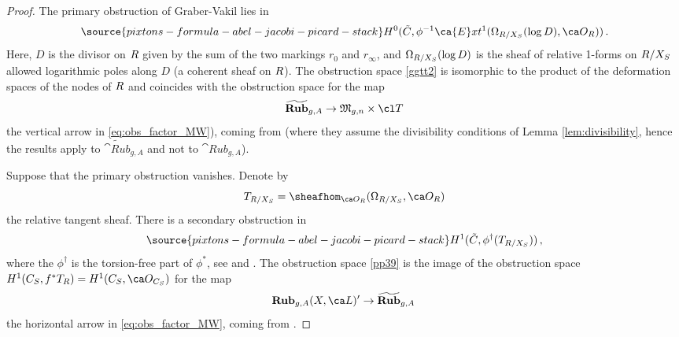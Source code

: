 \begin{proof}
The primary obstruction of Graber-Vakil lies in
\begin{equation}\label{ggtt2}
\source{pixtons-formula-abel-jacobi-picard-stack}
H^0(\tilde C, \phi^{-1}\ca{E}xt^1(\Omega_{\R/X_S}(\log D), \ca O_{\R}))\, .
\end{equation}
Here, $D$ is the divisor on $R$ given by the sum of the two markings $r_0$ and $r_\infty$, and $\Omega_{R/X_S}(\log D)$ is the sheaf of relative 1-forms on $R/X_S$ allowed logarithmic poles along $D$ (a coherent sheaf on $R$). The obstruction space
\eqref{ggtt2}
is isomorphic to the product of the deformation spaces of the nodes of $R$
and coincides with the obstruction space
for the map $$\widetilde{\cat{Rub}}_{g,A} \to \frak M_{g,n} \times \cl T$$ the vertical arrow in \eqref{eq:obs_factor_MW}), coming from \cite[Proposition ]{Marcus2017Logarithmic-com} (where they assume the divisibility conditions of Lemma \ref{lem:divisibility}, hence the results apply to $\widetilde{\cat{Rub}}_{g, A}$ and not to $\cat{Rub}_{g, A}$).

Suppose that the primary obstruction vanishes. Denote by $$T_{\R/X_S} = \sheafhom_{\ca O_{\R}}(\Omega_{\R/X_S} , \ca O_{\R})$$ the relative tangent sheaf. There is a secondary obstruction in
\begin{equation}\label{pp39}
\source{pixtons-formula-abel-jacobi-picard-stack}
H^1(\tilde{C}, \phi^{\dagger}(T_{\R/X_S}))\,,
\end{equation}
where the $\phi^{\dagger}$ is the torsion-free part of $\phi^*$, see \cite{Graber2005Relative-virtua} and \cite{Marcus2017Logarithmic-com}. The
obstruction space \eqref{pp39}
is the image of the obstruction space $H^1 (C_S, f^* T_\R ) = H^1(C_S, \ca O_{C_S})$ for the map $$\cat{Rub}_{g,A}(X, \ca L)' \to \widetilde{\cat{Rub}}_{g,A}\, $$
the horizontal arrow in \eqref{eq:obs_factor_MW}, coming from \cite[Proposition ]{Marcus2017Logarithmic-com}.





\end{proof}
